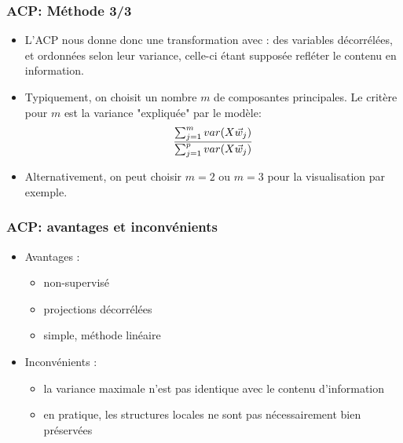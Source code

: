 \begin{frame}
\frametitle{ACP: Méthode 3/3}
  \begin{itemize}
  	\item L'ACP nous donne donc une transformation avec : des variables décorrélées, et ordonnées selon leur variance, celle-ci étant supposée refléter le contenu en information. 
  	\item Typiquement, on choisit un nombre $m$ de composantes principales. Le critère pour $m$ est la variance "expliquée" par le modèle: 
    \begin{equation}
      \frac{\sum_{j=1}^{m}var(X\vec{w}_j)}{\sum_{j=1}^pvar(X\vec{w}_j)}
    \end{equation}
  	\item Alternativement, on peut choisir $m=2$ ou $m=3$ pour la visualisation par exemple.   
  \end{itemize}
\end{frame}

\begin{frame}
\frametitle{ACP: avantages et inconvénients}
  \begin{itemize}
  	\item Avantages : 
  	\begin{itemize}
  		\item non-supervisé
  		\item projections décorrélées 
  		\item simple, méthode linéaire
  	\end{itemize}
  	\item Inconvénients : 
  	\begin{itemize}
  		\item la variance maximale n'est pas identique avec le contenu d'information
  		\item en pratique, les structures locales ne sont pas nécessairement bien préservées 
  	\end{itemize}
  \end{itemize}
\end{frame}

